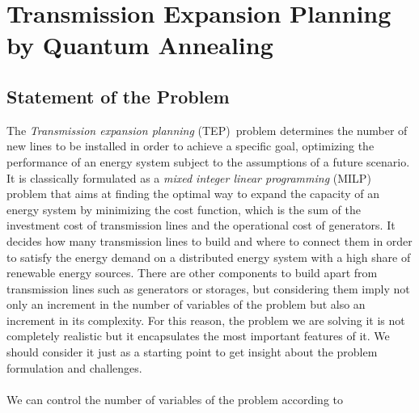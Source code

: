 \chapter{Transmission Expansion Planning by Quantum Annealing} %
\label{Chapter4} %
\section{Statement of the Problem}
The \textit{Transmission expansion planning} (TEP)\,\cite{Neumann2020TransmissionFlows} problem determines the number of new lines to be installed in order to achieve a specific goal, optimizing the performance of an energy system subject to the assumptions of a future scenario. It is classically formulated as a \textit{mixed integer linear programming} (MILP) problem that aims at finding the optimal way to expand the capacity of an energy system by minimizing the cost function, which is the sum of the investment cost of transmission lines and the operational cost of generators. It decides how many transmission lines to build and where to connect them in order to satisfy the energy demand on a distributed energy system with a high share of renewable energy sources. There are other components to build apart from transmission lines such as generators or storages, but considering them imply not only an increment in the number of variables of the problem but also an increment in its complexity. For this reason, the problem we are solving it is not completely realistic but it encapsulates the most important features of it. We should consider it just as a starting point to get insight about the problem formulation and challenges.\\\\
We can control the number of variables of the problem according to
